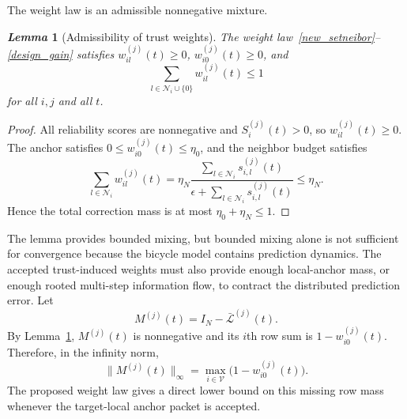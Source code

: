 \documentclass[letterpaper,journal]{IEEEtran}
\def\V{\mathcal{V}} %
\def\L{\mathcal{L}} %
\def\N{\mathcal{N}} %
\newtheorem{lemma}{\it Lemma}%
\begin{document}
The weight law is an admissible nonnegative mixture.

\begin{lemma}[Admissibility of trust weights]\label{lem_weight_admissible}
The weight law~\eqref{new_setneibor}--\eqref{design_gain} satisfies $w_{il}^{(j)}(t)\ge0$, $w_{i0}^{(j)}(t)\ge0$, and
\begin{equation}
\sum_{l\in\N_i\cup\{0\}}w_{il}^{(j)}(t)\le1
\end{equation}
for all $i,j$ and all $t$.
\end{lemma}
\begin{proof}
All reliability scores are nonnegative and $S_i^{(j)}(t)>0$, so $w_{il}^{(j)}(t)\ge0$. The anchor satisfies $0\le w_{i0}^{(j)}(t)\le\eta_0$, and the neighbor budget satisfies
\[
\sum_{l\in\N_i}w_{il}^{(j)}(t)
=\eta_N\frac{\sum_{l\in\N_i}s_{i,l}^{(j)}(t)}
{\epsilon+\sum_{l\in\N_i}s_{i,l}^{(j)}(t)}
\le\eta_N .
\]
Hence the total correction mass is at most $\eta_0+\eta_N\le1$.
\end{proof}

The lemma provides bounded mixing, but bounded mixing alone is not sufficient for convergence because the bicycle model contains prediction dynamics. The accepted trust-induced weights must also provide enough local-anchor mass, or enough rooted multi-step information flow, to contract the distributed prediction error. Let
\begin{equation}
    M^{(j)}(t)=I_N-\bar{\L}^{(j)}(t).
\end{equation}
By Lemma~\ref{lem_weight_admissible}, $M^{(j)}(t)$ is nonnegative and its $i$th row sum is $1-w_{i0}^{(j)}(t)$. Therefore, in the infinity norm,
\begin{equation}
    \|M^{(j)}(t)\|_{\infty}
    =
    \max_{i\in\V}\big(1-w_{i0}^{(j)}(t)\big).
    \label{eq_M_inf_norm}
\end{equation}
The proposed weight law gives a direct lower bound on this missing row mass whenever the target-local anchor packet is accepted.
\end{document}
